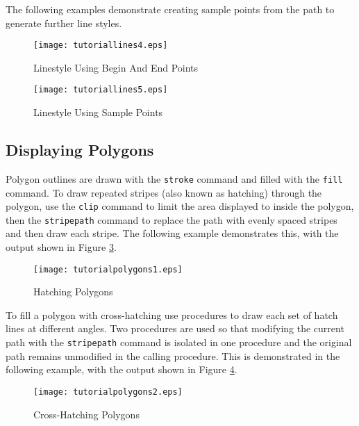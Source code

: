 The following examples demonstrate creating sample points
from the path to generate further line styles.



\begin{figure}[htb]
\texttt{[image: tutoriallines4.eps]}
\caption{Linestyle Using Begin And End Points}
\label{tutoriallines4}
\end{figure}



\begin{figure}[htb]
\texttt{[image: tutoriallines5.eps]}
\caption{Linestyle Using Sample Points}
\label{tutoriallines5}
\end{figure}

\subsection{Displaying Polygons}

Polygon outlines are drawn with the \texttt{stroke}
command and filled with the \texttt{fill} command.
To draw repeated stripes (also known as hatching) through
the polygon, use the \texttt{clip}
command to limit the area displayed to inside the polygon,
then the \texttt{stripepath}
command to replace the path with evenly spaced stripes and
then draw each stripe.  The following example demonstrates this,
with the output shown in Figure \ref{tutorialpolygons1}.



\begin{figure}[htb]
\texttt{[image: tutorialpolygons1.eps]}
\caption{Hatching Polygons}
\label{tutorialpolygons1}
\end{figure}

To fill a polygon with cross-hatching use procedures to
draw each set of hatch lines at different angles.  Two procedures
are used so that modifying the current path with the
\texttt{stripepath}
command is isolated in one procedure and the original path
remains unmodified in the calling procedure.
This is demonstrated in the following example, with the output
shown in Figure \ref{tutorialpolygons2}.



\begin{figure}[htb]
\texttt{[image: tutorialpolygons2.eps]}
\caption{Cross-Hatching Polygons}
\label{tutorialpolygons2}
\end{figure}

